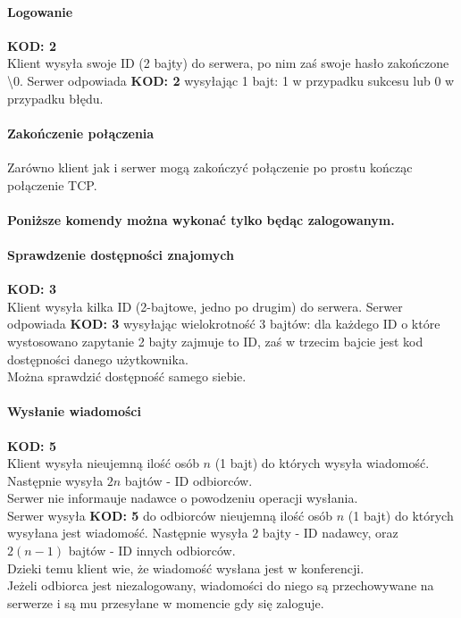 \documentclass[10pt,a4paper]{article}
\newcommand{\kod}[1]{\textbf{\small{KOD: #1}}}
\begin{document}
	\paragraph{Logowanie}\kod{2}\\
		Klient wysyła swoje ID (2 bajty) do serwera, po nim zaś swoje hasło zakończone \textbackslash{}0.
		Serwer odpowiada \kod{2} wysyłając 1 bajt: 1 w przypadku sukcesu lub 0 w przypadku błędu.\\
	\paragraph{Zakończenie połączenia} Zarówno klient jak i serwer mogą zakończyć połączenie po prostu
		kończąc połączenie TCP.
	
	\paragraph{} \textbf{Poniższe komendy można wykonać tylko będąc zalogowanym.}
	\paragraph{Sprawdzenie dostępności znajomych}\kod{3}\\
		Klient wysyła kilka ID (2-bajtowe, jedno po drugim) do serwera.
		Serwer odpowiada \kod{3} wysyłając wielokrotność 3 bajtów: dla każdego ID o które wystosowano zapytanie
		2 bajty zajmuje to ID, zaś w trzecim bajcie jest kod dostępności danego użytkownika.\\
		Można sprawdzić dostępność samego siebie.
	\paragraph{Wysłanie wiadomości}\kod{5}\\
		Klient wysyła nieujemną ilość osób $n$ (1 bajt) do których wysyła wiadomość. Następnie wysyła $2n$ bajtów -
		ID odbiorców.\\
		Serwer nie informauje nadawce o powodzeniu operacji wysłania.\\
		Serwer wysyła \kod{5} do odbiorców nieujemną ilość osób $n$ (1 bajt) do których wysyłana jest wiadomość.
		Następnie wysyła $2$ bajty - ID nadawcy, oraz $2(n-1)$ bajtów - ID innych odbiorców.\\
		Dzieki temu klient wie, że wiadomość wysłana jest w konferencji.\\
		Jeżeli odbiorca jest niezalogowany, wiadomości do niego są przechowywane na serwerze
		i są mu przesyłane w momencie gdy się zaloguje.
\end{document}
